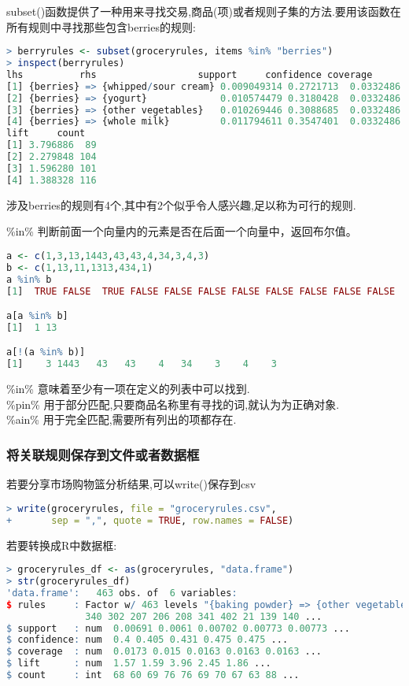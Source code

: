 \documentclass[11pt,a4paper,oneside]{book}
\begin{document}
subset()函数提供了一种用来寻找交易,商品(项)或者规则子集的方法.要用该函数在所有规则中寻找那些包含berries的规则:
\begin{lstlisting}[language=r]
> berryrules <- subset(groceryrules, items %in% "berries")
> inspect(berryrules)
lhs          rhs                  support     confidence coverage 
[1] {berries} => {whipped/sour cream} 0.009049314 0.2721713  0.0332486
[2] {berries} => {yogurt}             0.010574479 0.3180428  0.0332486
[3] {berries} => {other vegetables}   0.010269446 0.3088685  0.0332486
[4] {berries} => {whole milk}         0.011794611 0.3547401  0.0332486
lift     count
[1] 3.796886  89  
[2] 2.279848 104  
[3] 1.596280 101  
[4] 1.388328 116  
\end{lstlisting}
涉及berries的规则有4个,其中有2个似乎令人感兴趣,足以称为可行的规则.
\begin{tcolorbox}[colback=pink!10!white,colframe=pink!100!black]
\%in\%  判断前面一个向量内的元素是否在后面一个向量中，返回布尔值。
\begin{lstlisting}[language=r]
a <- c(1,3,13,1443,43,43,4,34,3,4,3)
b <- c(1,13,11,1313,434,1)
a %in% b
[1]  TRUE FALSE  TRUE FALSE FALSE FALSE FALSE FALSE FALSE FALSE FALSE

a[a %in% b]
[1]  1 13

a[!(a %in% b)]
[1]    3 1443   43   43    4   34    3    4    3
\end{lstlisting}
\end{tcolorbox}
\begin{tcolorbox}[colback=blue!7!white,colframe=blue!40]
\%in\% 意味着至少有一项在定义的列表中可以找到.\\
\%pin\% 用于部分匹配,只要商品名称里有寻找的词,就认为为正确对象.\\
\%ain\% 用于完全匹配,需要所有列出的项都存在.\\
\end{tcolorbox}

\subsubsection{将关联规则保存到文件或者数据框}
若要分享市场购物篮分析结果,可以write()保存到csv
\begin{lstlisting}[language=r]
> write(groceryrules, file = "groceryrules.csv",
+       sep = ",", quote = TRUE, row.names = FALSE)
\end{lstlisting}

若要转换成R中数据框:
\begin{lstlisting}[language=r]
> groceryrules_df <- as(groceryrules, "data.frame")
> str(groceryrules_df)
'data.frame':	463 obs. of  6 variables:
$ rules     : Factor w/ 463 levels "{baking powder} => {other vegetables}",..: 
              340 302 207 206 208 341 402 21 139 140 ...
$ support   : num  0.00691 0.0061 0.00702 0.00773 0.00773 ...
$ confidence: num  0.4 0.405 0.431 0.475 0.475 ...
$ coverage  : num  0.0173 0.015 0.0163 0.0163 0.0163 ...
$ lift      : num  1.57 1.59 3.96 2.45 1.86 ...
$ count     : int  68 60 69 76 76 69 70 67 63 88 ...
\end{lstlisting}
\end{document}
